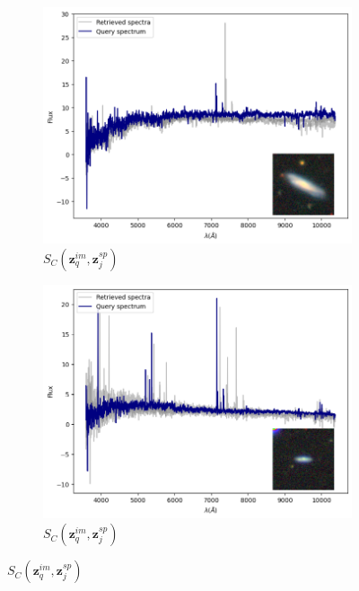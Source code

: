 \documentclass[a4paper,12pt]{article}
\begin{document}
\begin{figure}[H]
    \begin{subfigure}[b]{0.45\textwidth}
        \centering
        \includegraphics[width=\textwidth]{../figures/spectral_retrieval_sp_im_1}
        \caption{$S_C(\mathbf{z}_q^{im}, \mathbf{z}_j^{sp})$}
        \label{fig:sp_im_1}
    \end{subfigure}%
    \hfill
    \begin{subfigure}[b]{0.45\textwidth}
        \centering
        \includegraphics[width=\textwidth]{../figures/spectral_retrieval_sp_im_2}
        \caption{$S_C(\mathbf{z}_q^{im}, \mathbf{z}_j^{sp})$}
        \label{fig:sp_im_2}
    \end{subfigure}


\end{figure}
\end{document}
